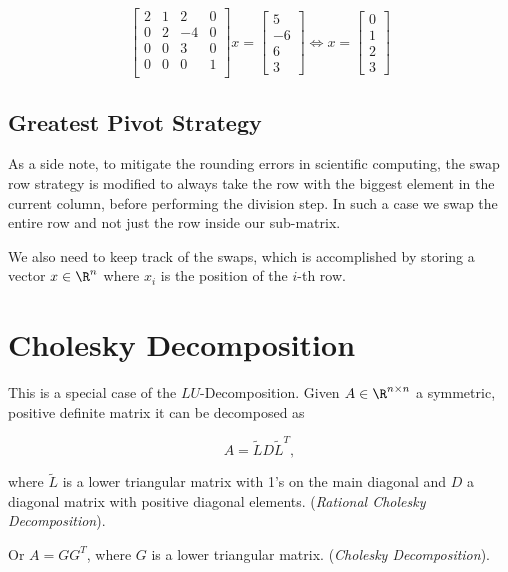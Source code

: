 \[
    \begin{bmatrix} 
        2 & 1 & 2 & 0 \\  
        0 & 2 & -4 & 0 \\  
        0 & 0 & 3 & 0 \\
        0 & 0 & 0 & 1 \\ 
    \end{bmatrix}
    x = 
    \begin{bmatrix}
        5 \\ 
        -6 \\
        6 \\ 
        3  
    \end{bmatrix}
    \iff
    x =
    \begin{bmatrix}
        0 \\ 
        1 \\ 
        2 \\
        3
    \end{bmatrix}
\]

\subsection{Greatest Pivot Strategy}

As a side note, to mitigate the rounding errors in scientific computing, the swap row strategy is 
modified to always take the row with the biggest element in the current column, before performing the division step. In such a case we swap the entire row 
and not just the row inside our sub-matrix. 

We also need to keep track of the swaps, which is accomplished by storing a vector \(x \in \R^n\) where \(x_i\) is the position of the \(i\)-th row.

\section{Cholesky Decomposition}

This is a special case of the \(LU\)-Decomposition. Given \(A \in \R^{n \times n}\) a symmetric, positive definite matrix it can be decomposed as 

\[
    A = \tilde{L}D\tilde{L}^T,
\]

where \(\tilde{L}\) is a lower triangular matrix with 1's on the main diagonal and \(D\) a diagonal matrix with positive 
diagonal elements. (\emph{Rational Cholesky Decomposition}).

Or \(A = G G^T\), where \(G\) is a lower triangular matrix. (\emph{Cholesky Decomposition}).

